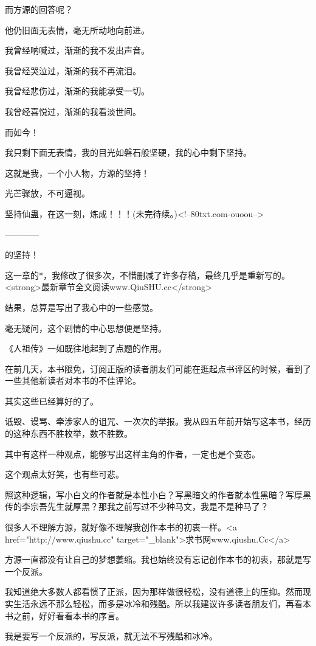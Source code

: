 \begin{this_body}
而方源的回答呢？

他仍旧面无表情，毫无所动地向前进。

我曾经呐喊过，渐渐的我不发出声音。

我曾经哭泣过，渐渐的我不再流泪。

我曾经悲伤过，渐渐的我能承受一切。

我曾经喜悦过，渐渐的我看淡世间。

而如今！

我只剩下面无表情，我的目光如磐石般坚硬，我的心中剩下坚持。

这就是我，一个小人物，方源的坚持！

光芒骤放，不可逼视。

坚持仙蛊，在这一刻，炼成！！！(未完待续。)<!--80txt.com-ouoou-->

------------

的坚持！

这一章的*，我修改了很多次，不惜删减了许多存稿，最终几乎是重新写的。<strong>最新章节全文阅读www.QiuSHU.cc</strong>

结果，总算是写出了我心中的一些感觉。

毫无疑问，这个剧情的中心思想便是坚持。

《人祖传》一如既往地起到了点题的作用。

在前几天，本书限免，订阅正版的读者朋友们可能在逛起点书评区的时候，看到了一些其他新读者对本书的不佳评论。

其实这些已经算好的了。

诋毁、谩骂、牵涉家人的诅咒、一次次的举报。我从四五年前开始写这本书，经历的这种东西不胜枚举，数不胜数。

其中有这样一种观点，能够写出这样主角的作者，一定也是个变态。

这个观点太好笑，也有些可悲。

照这种逻辑，写小白文的作者就是本性小白？写黑暗文的作者就本性黑暗？写厚黑传的李宗吾先生就厚黑？那我之前写过不少种马文，我是不是种马了？

很多人不理解方源，就好像不理解我创作本书的初衷一样。<a href="http://www.qiushu.cc" target="\_blank">求书网www.qiushu.Cc</a>

方源一直都没有让自己的梦想萎缩。我也始终没有忘记创作本书的初衷，那就是写一个反派。

我知道绝大多数人都看惯了正派，因为那样做很轻松，没有道德上的压抑。然而现实生活永远不那么轻松，而多是冰冷和残酷。所以我建议许多读者朋友们，再看本书之前，好好看看本书的序言。

我是要写一个反派的，写反派，就无法不写残酷和冰冷。


\end{this_body}
